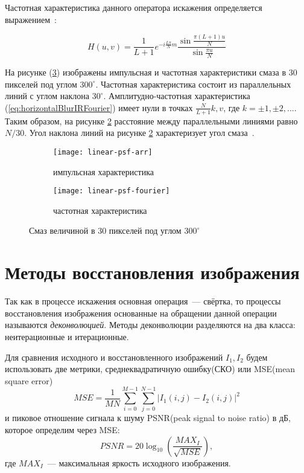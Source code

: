 Частотная характеристика данного оператора искажения определяется выражением~\cite{iterableImageRestorationBiemonLangdeik}:

\begin{equation}\label{eq:horizontalBlurIRFourier}
H(u,v) =       
	\frac{1}{L+1}e^{-i\frac{L\pi}{N}m}\frac{\sin\frac{\pi(L+1)u}{N}}{\sin\frac{\pi u}{N}}
\end{equation}

На рисунке (\ref{fig:linearPsf}) изображены импульсная и частотная характеристики смаза в 30 пикселей под углом $300^\circ$. Частотная характеристика состоит из параллельных линий с углом наклона $30^\circ$. Амплитудно-частотная характеристика (\ref{eq:horizontalBlurIRFourier}) имеет нули в точках $\frac{N}{L+1}k, v$, где $k = \pm 1, \pm2, ...$. Таким образом, на рисунке \ref{fig:linearPsfFourier} расстояние между параллельными линиями равно $N/30$. Угол наклона линий на рисунке \ref{fig:linearPsfFourier} характеризует угол смаза~\cite{iterableImageRestorationBiemonLangdeik}.
\begin{figure}[h!]
	\centering
	\begin{subfigure}[b]{0.5\textwidth}
		\texttt{[image: linear-psf-arr]}
		\caption{импульсная характеристика}
		\label{fig:linearPsfArr}
	\end{subfigure}%
	\begin{subfigure}[b]{0.5\textwidth}
		\texttt{[image: linear-psf-fourier]}%
		\caption{частотная характеристика}
		\label{fig:linearPsfFourier}
	\end{subfigure}%
	\caption{Смаз величиной в 30 пикселей под углом $300^{\circ}$}\label{fig:linearPsf}
\end{figure}

\section{Методы восстановления изображения}
Так как в процессе искажения основная операция~--- свёртка, то процессы восстановления изображения основанные на обращении данной операции называются \textit{деконволюцией}. Методы деконволюции разделяются на два класса: неитерационные и итерационные.

Для сравнения исходного и восстановленного изображений $I_1, I_2$ будем использовать две метрики, среднеквадратичную ошибку(СКО) или MSE(mean square error)
\begin{equation}\label{eq:mse}
MSE = \frac{1}{MN}\sum_{i=0}^{M-1}\sum_{j=0}^{N-1}\left| I_1(i,j)-I_2(i,j)\right|^2
\end{equation}
и пиковое отношение сигнала к шуму PSNR(peak signal to noise ratio) в дБ, которое определим через MSE: 
\begin{equation}\label{eq:psnr}
PSNR = 20\log_{10}\left(\frac{MAX_I}{\sqrt{MSE}}\right),
\end{equation}
где $MAX_I$~--- максимальная яркость исходного изображения.

